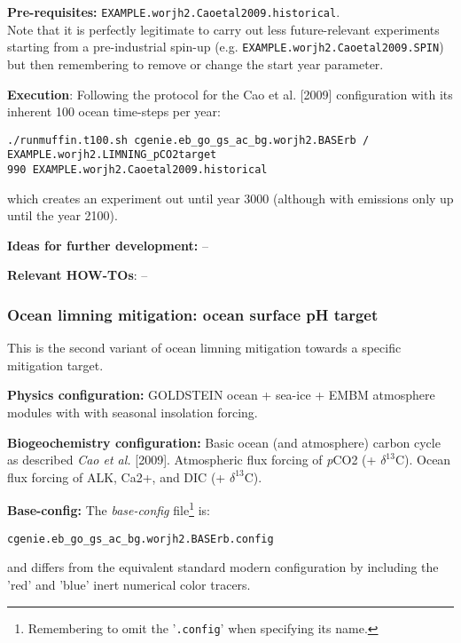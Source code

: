\documentclass[10pt,twoside]{article}
\begin{document}
\noindent \textbf{Pre-requisites:} \texttt{EXAMPLE.worjh2.Caoetal2009.historical}.
\\ Note that it is perfectly legitimate to carry out less future-relevant experiments starting from a pre-industrial spin-up (e.g. \texttt{EXAMPLE.worjh2.Caoetal2009.SPIN}) but then remembering to remove or change the start year parameter.

\noindent \textbf{Execution}: Following the protocol for the Cao et al. [2009] configuration with its inherent 100 ocean time-steps per year:
\vspace{-10pt}\small\begin{verbatim}./runmuffin.t100.sh cgenie.eb_go_gs_ac_bg.worjh2.BASErb / EXAMPLE.worjh2.LIMNING_pCO2target 
990 EXAMPLE.worjh2.Caoetal2009.historical\end{verbatim}\normalsize\vspace{-10pt}
which creates an experiment out until year 3000 (although with emissions only up until the year 2100).

\noindent \textbf{Ideas for further development:} --

\noindent \textbf{Relevant HOW-TOs}: --


\subsubsection{Ocean limning mitigation: ocean surface pH target}\label{EXAMPLE.worjh2.LIMNING.pHtarget}

This is the second variant of ocean limning mitigation towards a specific mitigation target.

\noindent \textbf{Physics configuration:} GOLDSTEIN ocean + sea-ice + EMBM atmosphere modules with with seasonal insolation forcing.

\noindent \textbf{Biogeochemistry configuration:} Basic ocean (and atmosphere) carbon cycle as described \textit{Cao et al.} [2009]. Atmospheric flux forcing of \textit{p}CO2 (+ $\delta^{13}$C). Ocean flux forcing of ALK, Ca2+, and  DIC (+ $\delta^{13}$C).

\noindent \textbf{Base-config:} The \textit{base-config} file\footnote{Remembering to omit the '\texttt{.config}' when specifying its name.} is:
\vspace{-10pt}\begin{verbatim}cgenie.eb_go_gs_ac_bg.worjh2.BASErb.config\end{verbatim}\vspace{-10pt}
and differs from the equivalent standard modern configuration by including the 'red' and 'blue' inert numerical color tracers.
\end{document}
